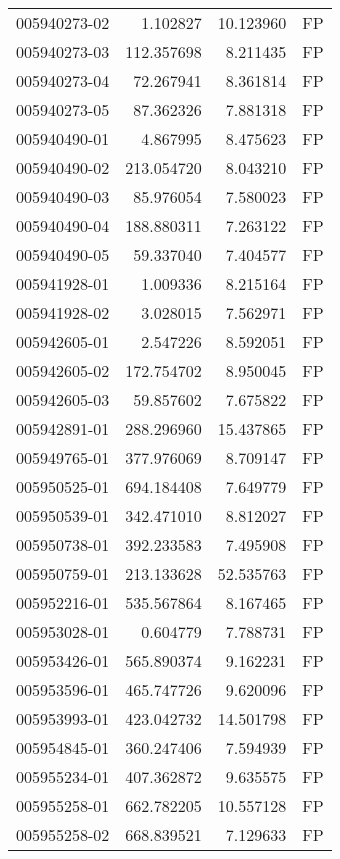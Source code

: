 \begin{tabular}{lrrl}
005940273-02 &    1.102827 &    10.123960 &   FP \\
005940273-03 &  112.357698 &     8.211435 &   FP \\
005940273-04 &   72.267941 &     8.361814 &   FP \\
005940273-05 &   87.362326 &     7.881318 &   FP \\
005940490-01 &    4.867995 &     8.475623 &   FP \\
005940490-02 &  213.054720 &     8.043210 &   FP \\
005940490-03 &   85.976054 &     7.580023 &   FP \\
005940490-04 &  188.880311 &     7.263122 &   FP \\
005940490-05 &   59.337040 &     7.404577 &   FP \\
005941928-01 &    1.009336 &     8.215164 &   FP \\
005941928-02 &    3.028015 &     7.562971 &   FP \\
005942605-01 &    2.547226 &     8.592051 &   FP \\
005942605-02 &  172.754702 &     8.950045 &   FP \\
005942605-03 &   59.857602 &     7.675822 &   FP \\
005942891-01 &  288.296960 &    15.437865 &   FP \\
005949765-01 &  377.976069 &     8.709147 &   FP \\
005950525-01 &  694.184408 &     7.649779 &   FP \\
005950539-01 &  342.471010 &     8.812027 &   FP \\
005950738-01 &  392.233583 &     7.495908 &   FP \\
005950759-01 &  213.133628 &    52.535763 &   FP \\
005952216-01 &  535.567864 &     8.167465 &   FP \\
005953028-01 &    0.604779 &     7.788731 &   FP \\
005953426-01 &  565.890374 &     9.162231 &   FP \\
005953596-01 &  465.747726 &     9.620096 &   FP \\
005953993-01 &  423.042732 &    14.501798 &   FP \\
005954845-01 &  360.247406 &     7.594939 &   FP \\
005955234-01 &  407.362872 &     9.635575 &   FP \\
005955258-01 &  662.782205 &    10.557128 &   FP \\
005955258-02 &  668.839521 &     7.129633 &   FP \\

\end{tabular}
